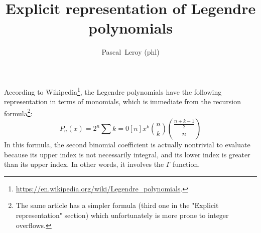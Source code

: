 \documentclass[10pt, a4paper, twoside]{basestyle}
\title{Explicit representation of Legendre polynomials}
\date{\printdate{2018-09-03}}
\author{Pascal~Leroy (phl)}
\begin{document}
\maketitle
\noindent
According to Wikipedia\footnote{\url{https://en.wikipedia.org/wiki/Legendre_polynomials}.}, the Legendre polynomials have the following representation in terms of monomials, which is immediate from the recursion formula\footnote{The same article has a simpler formula (third one in the "Explicit representation" section) which unfortunately is more prone to integer overflows.}:
\begin{equation*}
P_n(x) = 2^n \sum{k = 0}[n] x^k \binom{n}{k} \binom{\frac{n + k - 1}{2}}{n}
\end{equation*}
In this formula, the second binomial coefficient is actually nontrivial to evaluate because its upper index is not necessarily integral, and its lower index is greater than its upper index.  In other words, it involves the $\Gamma$ function.
\end{document}
